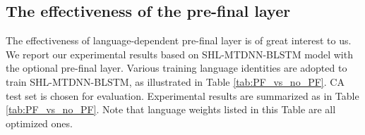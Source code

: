 \documentclass[a4paper]{article}
\begin{document}
\subsection{The effectiveness of the pre-final layer}
The effectiveness of language-dependent pre-final layer is of great interest to us. We report our experimental results based on SHL-MTDNN-BLSTM model with the optional pre-final layer. Various training language identities are adopted to train SHL-MTDNN-BLSTM, as illustrated in Table \ref{tab:PF_vs_no_PF}. CA test set is chosen for evaluation. Experimental results are summarized as in Table \ref{tab:PF_vs_no_PF}. Note that language weights listed in this Table are all optimized ones.
%
%
%
%
%
\end{document}
